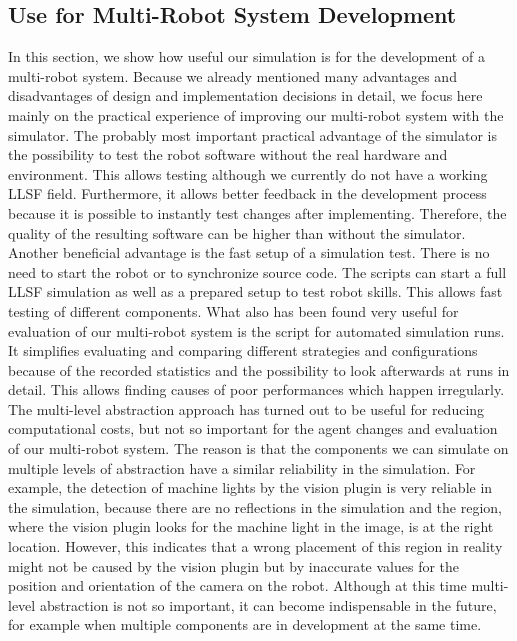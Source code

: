 \subsection{Use for Multi-Robot System Development}
In this section, we show how useful our simulation is for the development of a multi-robot system. Because we already mentioned many advantages and disadvantages of design and implementation decisions in detail, we focus here mainly on the practical experience of improving our multi-robot system with the simulator. 
The probably most important practical advantage of the simulator is the possibility to test the robot software without the real hardware and environment. This allows testing although we currently do not have a working LLSF field. Furthermore, it allows better feedback in the development process because it is possible to instantly test changes after implementing. Therefore, the quality of the resulting software can be higher than without the simulator. Another beneficial advantage is the fast setup of a simulation test. There is no need to start the robot or to synchronize source code. The scripts can start a full LLSF simulation as well as a prepared setup to test robot skills. This allows fast testing of different components.
What also has been found very useful for evaluation of our multi-robot system is the script for automated simulation runs. It simplifies evaluating and comparing different strategies and configurations because of the recorded statistics and the possibility to look afterwards at runs in detail. This allows finding causes of poor performances which happen irregularly.\\
The multi-level abstraction approach has turned out to be useful for reducing computational costs, but not so important for the agent changes and evaluation of our multi-robot system. The reason is that the components we can simulate on multiple levels of abstraction have a similar reliability in the simulation. For example, the detection of machine lights by the vision plugin is very reliable in the simulation, because there are no reflections in the simulation and the region, where the vision plugin looks for the machine light in the image, is at the right location. However, this indicates that a wrong placement of this region in reality might not be caused by the vision plugin but by inaccurate values for the position and orientation of the camera on the robot. Although at this time multi-level abstraction is not so important, it can become indispensable in the future, for example when multiple components are in development at the same time.\\
